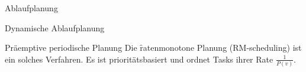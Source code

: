 \begin{chapter}{Ablaufplanung}
\begin{section}{Dynamische Ablaufplanung}
\begin{subsection}{Präemptive periodische Planung}
   Die \f{ratenmonotone Planung (RM-scheduling)} ist ein solches Verfahren. Es ist prioritätsbasiert und ordnet Tasks ihrer Rate $\frac{1}{P(v)}$.
   
   
   


  \end{subsection}
  \end{section}
\end{chapter}
